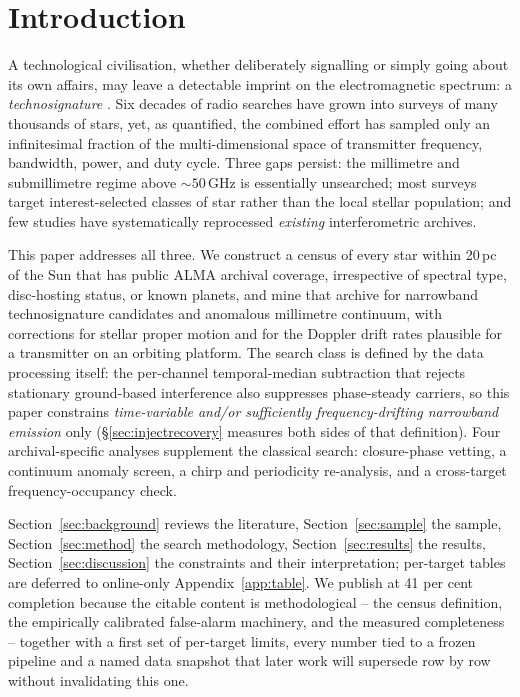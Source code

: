 \documentclass{openjournal}
\begin{document}

\section{Introduction}
\label{sec:intro}

A technological civilisation, whether deliberately signalling or simply
going about its own affairs, may leave a detectable imprint on the
electromagnetic spectrum: a \emph{technosignature}
\citep{Sheikh2020,SETIreview2025}. Six decades of radio searches have
grown into surveys of many thousands of stars, yet, as
\citet{Wright2018} quantified, the combined effort has sampled only an
infinitesimal fraction of the multi-dimensional space of transmitter
frequency, bandwidth, power, and duty cycle. Three gaps persist: the
millimetre and submillimetre regime above ${\sim}50$\,GHz is
essentially unsearched; most surveys target interest-selected classes
of star rather than the local stellar population; and few studies have
systematically reprocessed \emph{existing} interferometric archives.

This paper addresses all three. We construct a census of every star
within 20\,pc of the Sun that has public ALMA archival coverage,
irrespective of spectral type, disc-hosting status, or known planets,
and mine that archive for narrowband technosignature candidates and
anomalous millimetre continuum, with corrections for stellar proper
motion and for the Doppler drift rates plausible for a transmitter on
an orbiting platform. The search class is defined by the data
processing itself: the per-channel temporal-median subtraction that
rejects stationary ground-based interference also suppresses
phase-steady carriers, so this paper constrains \emph{time-variable
and/or sufficiently frequency-drifting narrowband emission} only
(\S\ref{sec:injectrecovery} measures both sides of that definition).
Four archival-specific analyses supplement the classical search:
closure-phase vetting, a continuum anomaly screen, a chirp and
periodicity re-analysis, and a cross-target frequency-occupancy check.

Section~\ref{sec:background} reviews the literature,
Section~\ref{sec:sample} the sample, Section~\ref{sec:method} the
search methodology, Section~\ref{sec:results} the results,
Section~\ref{sec:discussion} the constraints and their interpretation;
per-target tables are deferred to online-only Appendix~\ref{app:table}.
We publish at 41 per cent completion because the citable content is
methodological -- the census definition, the empirically calibrated
false-alarm machinery, and the measured completeness -- together with
a first set of per-target limits, every number tied to a frozen
pipeline and a named data snapshot that later work will supersede row
by row without invalidating this one.
\end{document}

